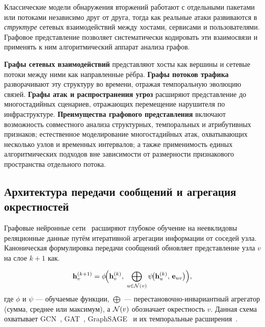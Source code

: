 Классические модели обнаружения вторжений работают с отдельными пакетами
или потоками независимо друг от друга, тогда как реальные атаки
развиваются в \emph{структуре} сетевых взаимодействий между хостами,
сервисами и пользователями. Графовое представление позволяет
систематически кодировать эти взаимосвязи и применять к ним
алгоритмический аппарат анализа графов.

\textbf{Графы сетевых взаимодействий} представляют хосты как вершины и
сетевые потоки между ними как направленные рёбра. \textbf{Графы потоков
трафика} разворачивают эту структуру во времени, отражая темпоральную
эволюцию связей. \textbf{Графы атак и распространения угроз} расширяют
представление до многостадийных сценариев, отражающих перемещение
нарушителя по инфраструктуре. \textbf{Преимущества графового
представления} включают возможность совместного анализа структурных,
темпоральных и атрибутивных признаков; естественное моделирование
многостадийных атак, охватывающих несколько узлов и временных интервалов;
а также применимость единых алгоритмических подходов вне зависимости от
размерности признакового пространства отдельного потока.

\label{sec:gnn_vulnerability}%

\subsection{Архитектура передачи сообщений и агрегация окрестностей}

Графовые нейронные сети~\cite{Kipf2017,Velickovic2018,Hamilton2017} расширяют глубокое обучение на неевклидовы реляционные данные путём итеративной агрегации информации от соседей узла. Каноническая формулировка передачи сообщений обновляет представление узла $v$ на слое $k+1$ как.

\begin{equation}
\mathbf{h}_v^{(k+1)}
= \phi\!\Bigl(\mathbf{h}_v^{(k)},\;
  \bigoplus_{u\in\mathcal{N}(v)}
    \psi\!\bigl(\mathbf{h}_u^{(k)},\, \mathbf{e}_{uv}\bigr)\Bigr),
\label{eq:ch1_mp}
\end{equation}где $\phi$ и $\psi$ --- обучаемые функции, $\bigoplus$ --- перестановочно-инвариантный агрегатор (сумма, среднее или максимум), а $\mathcal{N}(v)$ обозначает окрестность $v$. Данная схема охватывает GCN~\cite{Kipf2017}, GAT~\cite{Velickovic2018}, GraphSAGE~\cite{Hamilton2017} и их темпоральные расширения~\cite{Xu2020tgat,Rossi2020,Pei2020tgn,Kazemi2020,Schlichtkrull2018}.

